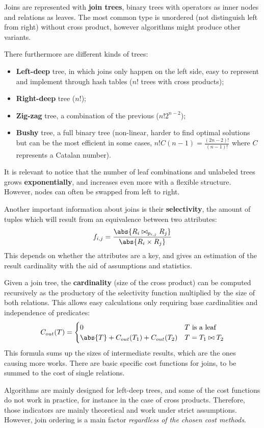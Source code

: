 Joins are represented with \textbf{join trees}, binary trees with operators as inner nodes and relations as leaves. The most common type is unordered (not distinguish left from right) without cross product, however algorithms might produce other variants.

There furthermore are different kinds of trees:
\begin{itemize}
	\item \textbf{Left-deep} tree, in which joins only happen on the left side, easy to represent and implement through hash tables ($n!$ trees with cross products);
	\item \textbf{Right-deep} tree ($n!$);
	\item \textbf{Zig-zag} tree, a combination of the previous ($n!2^{n-2}$);
	\item \textbf{Bushy} tree, a full binary tree (non-linear, harder to find optimal solutions but can be the most efficient in some cases, $n!C(n-1) = \frac{(2n-2)!}{(n-1)!}$ where $C$ represents a Catalan number).
\end{itemize}
It is relevant to notice that the number of leaf combinations and unlabeled trees grows \textbf{exponentially}, and increases even more with a flexible structure. However, nodes can often be swapped from left to right.

Another important information about joins is their \textbf{selectivity}, the amount of tuples which will result from an equivalence between two attributes: 
$$f_{i, j} = \frac{\abs{R_i \bowtie_{p_{i, j}} R_j}}{\abs{R_i \times R_j}}$$
This depends on whether the attributes are a key, and gives an estimation of the result cardinality with the aid of assumptions and statistics.

Given a join tree, the \textbf{cardinality} (size of the cross product) can be computed recursively as the productory of the selectivity function multiplied by the size of both relations. This allows easy calculations only requiring base cardinalities and independence of predicates:
$$C_{out}(T) = \begin{cases}
0 & T\text{ is a leaf} \\
\abs{T} + C_{out}(T_1) + C_{out}(T_2) & T = T_1 \bowtie T_2
\end{cases}$$
This formula sums up the sizes of intermediate results, which are the ones causing more works. There are basic specific cost functions for joins, to be summed to the cost of single relations. 

Algorithms are mainly designed for left-deep trees, and some of the cost functions do not work in practice, for instance in the case of cross products. Therefore, those indicators are mainly theoretical and work under strict assumptions. However, join ordering is a main factor \textit{regardless of the chosen cost methods}.

